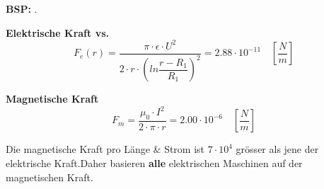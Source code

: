     \begin{minipage}{7cm}
        \textbf{BSP:}\newline
         .\hspace{3.5cm}
    \end{minipage}
    \begin{multicols}{2}
        \begin{minipage}{\linewidth}
           \textbf{Elektrische Kraft vs.}\newline
            \begin{equation*}
            F_e(r) = \dfrac{\pi\cdot\epsilon\cdot U^2}{2\cdot r\cdot\left(ln\dfrac{r-R_1}{R_1}\right)^2} = 2.88\cdot 10^{-11} \quad \left[\dfrac{N}{m}\right]
            \end{equation*}
        \end{minipage}

        \begin{minipage}{\linewidth}
            \textbf{Magnetische Kraft}\newline
            \begin{equation*}
             F_m = \dfrac{\mu_0\cdot I^2}{2\cdot\pi\cdot r} = 2.00 \cdot 10^{-6} \quad\left[\dfrac{N}{m}\right]
            \end{equation*}
        \end{minipage}        
    \end{multicols}
    
    \begin{minipage}{\linewidth}
        \vspace{0.5cm}
        Die magnetische Kraft pro Länge \& Strom ist $7 \cdot 10^4$ grösser als jene der elektrische Kraft.\newline \newline Daher basieren \textbf{alle} elektrischen Maschinen auf der magnetischen Kraft.
    \end{minipage}
    
